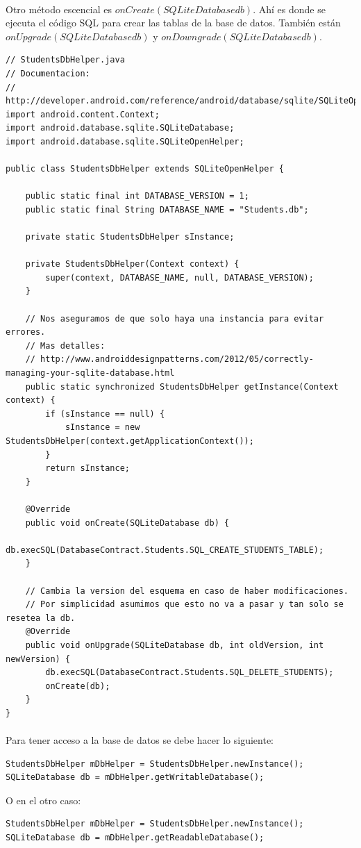 \documentclass[10pt]{extarticle}
\begin{document}
\paragraph{}
Otro método escencial es $onCreate(SQLiteDatabase db)$. Ahí es donde se ejecuta el código SQL para crear las tablas de la base de datos. También están $onUpgrade(SQLiteDatabase db)$ y $onDowngrade(SQLiteDatabase db)$.
\\
\begin{lstlisting}
// StudentsDbHelper.java
// Documentacion:
// http://developer.android.com/reference/android/database/sqlite/SQLiteOpenHelper.html
import android.content.Context;
import android.database.sqlite.SQLiteDatabase;
import android.database.sqlite.SQLiteOpenHelper;

public class StudentsDbHelper extends SQLiteOpenHelper {

    public static final int DATABASE_VERSION = 1;
    public static final String DATABASE_NAME = "Students.db";

    private static StudentsDbHelper sInstance;

    private StudentsDbHelper(Context context) {
        super(context, DATABASE_NAME, null, DATABASE_VERSION);
    }
	
	// Nos aseguramos de que solo haya una instancia para evitar errores.
	// Mas detalles: 
	// http://www.androiddesignpatterns.com/2012/05/correctly-managing-your-sqlite-database.html
    public static synchronized StudentsDbHelper getInstance(Context context) {
        if (sInstance == null) {
            sInstance = new StudentsDbHelper(context.getApplicationContext());
        }
        return sInstance;
    }
	
    @Override
    public void onCreate(SQLiteDatabase db) {
        db.execSQL(DatabaseContract.Students.SQL_CREATE_STUDENTS_TABLE);
    }
	
	// Cambia la version del esquema en caso de haber modificaciones.
	// Por simplicidad asumimos que esto no va a pasar y tan solo se resetea la db.
    @Override
    public void onUpgrade(SQLiteDatabase db, int oldVersion, int newVersion) {
        db.execSQL(DatabaseContract.Students.SQL_DELETE_STUDENTS);
        onCreate(db);
    }
}
\end{lstlisting}

\paragraph{}
Para tener acceso a la base de datos se debe hacer lo siguiente:
\begin{lstlisting}
StudentsDbHelper mDbHelper = StudentsDbHelper.newInstance();
SQLiteDatabase db = mDbHelper.getWritableDatabase();
\end{lstlisting}
O en el otro caso:
\begin{lstlisting}
StudentsDbHelper mDbHelper = StudentsDbHelper.newInstance();
SQLiteDatabase db = mDbHelper.getReadableDatabase();
\end{lstlisting}
\end{document}
